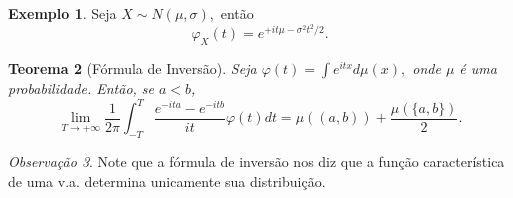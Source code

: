 \documentclass[12pt,a4paper,oneside]{book}
\newtheorem{theorem}{Teorema}[section]
\theoremstyle{definition}
\newtheorem{example}[theorem]{Exemplo}
\theoremstyle{remark}
\newtheorem{remark}[theorem]{Observa\c{c}\~ao}
\numberwithin{equation}{section}
\begin{document}
\begin{tcolorbox}

\begin{example}
Seja $X\sim N(\mu,\sigma), $ então 
$$\varphi_X(t) = e^{+it\mu -\sigma^2t^2/2}. $$

\end{example}
\end{tcolorbox}


\begin{theorem}[Fórmula de Inversão]\label{teo - forminvers} Seja $\varphi(t) = \int e^{itx}d\mu(x),$ onde $\mu$ é uma probabilidade. Então, se $a<b$,
$$\lim _{T\rightarrow +\infty}\dfrac{1}{2\pi} \int^T_{-T}\dfrac{e^{-ita}-e^{-itb}}{it} \varphi(t)dt = \mu((a,b)) + \dfrac{\mu(\{a,b\})}{2}. $$
\end{theorem}

\begin{tcolorbox}[colback = yellow!60]
\begin{remark}
Note que a fórmula de inversão nos diz que a função característica de uma v.a. determina unicamente sua distribuição.
\end{remark}
\end{tcolorbox}
\end{document}

